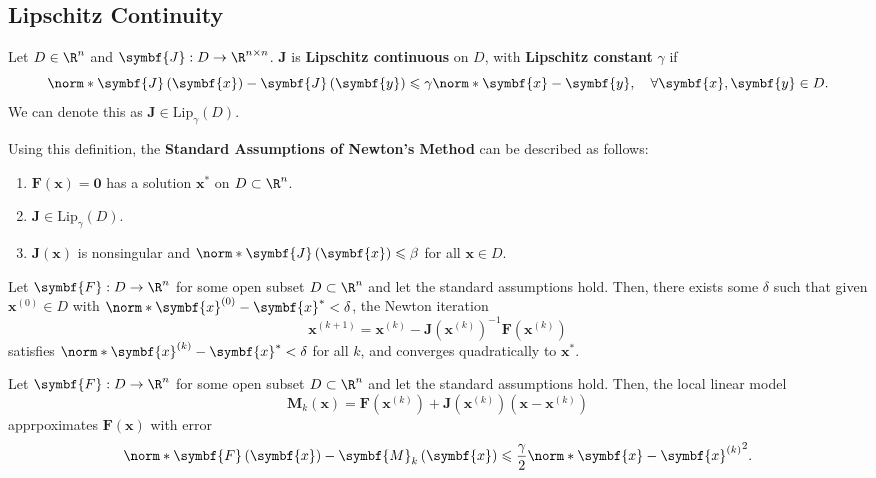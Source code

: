 \documentclass{article}
\begin{document}
\subsection{Lipschitz Continuity}
\begin{definition}
    Let \(D \in \R^n\) and \(\symbf{J} : D \to \R^{n \times n}\).
    \(\symbf{J}\) is \textbf{Lipschitz continuous} on \(D\), with
    \textbf{Lipschitz constant} \(\gamma\) if
    \begin{equation*}
        \norm*{\symbf{J}\left( \symbf{x} \right) - \symbf{J}\left( \symbf{y} \right)} \leqslant \gamma \norm*{\symbf{x} - \symbf{y}}, \quad \forall \symbf{x}, \symbf{y} \in D.
    \end{equation*}
    We can denote this as \(\symbf{J} \in \mathrm{Lip}_\gamma\left( D \right)\).
\end{definition}
Using this definition, the \textbf{Standard Assumptions of Newton's Method}
can be described as follows:
\begin{enumerate}
    \item \(\symbf{F}\left( \symbf{x} \right) = \symbf{0}\) has a solution \(\symbf{x}^\ast\) on \(D \subset \R^n\).
    \item \(\symbf{J} \in \mathrm{Lip}_\gamma\left( D \right)\).
    \item \(\symbf{J}\left( \symbf{x} \right)\) is nonsingular and \(\norm*{\symbf{J}\left( \symbf{x} \right)} \leqslant \beta\) for all \(\symbf{x} \in D\).
\end{enumerate}
\begin{theorem}
    Let \(\symbf{F} : D \to \R^n\) for some open subset \(D \subset \R^n\)
    and let the standard assumptions hold. Then, there exists some \(\delta\)
    such that given \(\symbf{x}^{\left( 0 \right)} \in D\) with
    \(\norm*{\symbf{x}^{\left( 0 \right)} - \symbf{x}^\ast} < \delta\),
    the Newton iteration
    \begin{equation*}
        \symbf{x}^{\left( k + 1 \right)} = \symbf{x}^{\left( k \right)} - \symbf{J}\left( \symbf{x}^{\left( k \right)} \right)^{-1} \symbf{F}\left( \symbf{x}^{\left( k \right)} \right)
    \end{equation*}
    satisfies \(\norm*{\symbf{x}^{\left( k \right)} - \symbf{x}^\ast} < \delta\)
    for all \(k\), and converges quadratically to \(\symbf{x}^\ast\).
\end{theorem}
\begin{lemma}
    Let \(\symbf{F} : D \to \R^n\) for some open subset \(D \subset \R^n\)
    and let the standard assumptions hold. Then, the local linear model
    \begin{equation*}
        \symbf{M}_k\left( \symbf{x} \right) = \symbf{F}\left( \symbf{x}^{\left( k \right)} \right) + \symbf{J}\left( \symbf{x}^{\left( k \right)} \right) \left( \symbf{x} - \symbf{x}^{\left( k \right)} \right)
    \end{equation*}
    apprpoximates \(\symbf{F}\left( \symbf{x} \right)\) with error
    \begin{equation*}
        \norm*{\symbf{F}\left( \symbf{x} \right) - \symbf{M}_k\left( \symbf{x} \right)} \leqslant \frac{\gamma}{2} \norm*{\symbf{x} - \symbf{x}^{\left( k \right)}}^2.
    \end{equation*}
\end{lemma}
\end{document}
